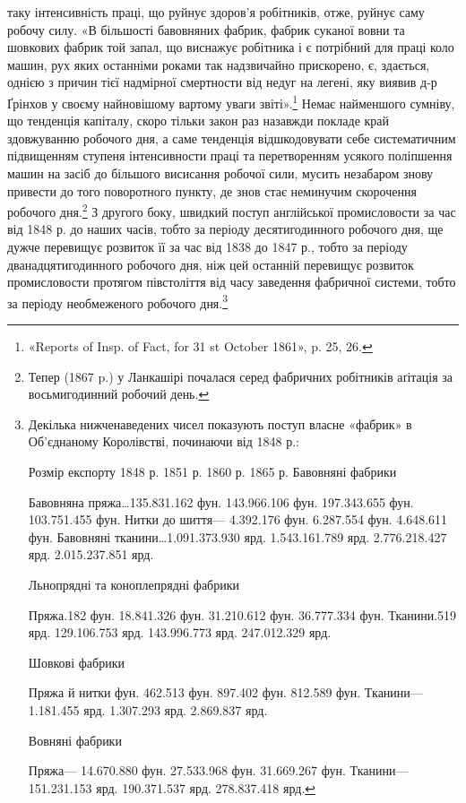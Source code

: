 \parcont{}  %
таку інтенсивність праці, що руйнує здоров’я робітників, отже,
руйнує саму робочу силу. «В більшості бавовняних фабрик, фабрик
суканої вовни та шовкових фабрик той запал, що виснажує
робітника і є потрібний для праці коло машин, рух яких останніми
роками так надзвичайно прискорено, є, здається, однією
з причин тієї надмірної смертности від недуг на легені, яку виявив
д-р Ґрінхов у своєму найновішому вартому уваги звіті».\footnote{
«Reports of Insp. of Fact, for 31 st October 1861», p. 25, 26.
}
Немає найменшого сумніву, що тенденція капіталу, скоро тільки
закон раз назавжди покладе край здовжуванню робочого дня,
а саме тенденція відшкодовувати себе систематичним підвищенням
ступеня інтенсивности праці та перетворенням усякого поліпшення
машин на засіб до більшого висисання робочої сили, мусить
незабаром знову привести до того поворотного пункту, де знов
стає неминучим скорочення робочого дня.\footnote{
Тепер (1867 p.) у Ланкашірі почалася серед фабричних робітників
аґітація за восьмигодинний робочий день.
} З другого боку,
швидкий поступ англійської промисловости за час від 1848 р. до
наших часів, тобто за періоду десятигодинного робочого дня, ще
дужче перевищує розвиток її за час від 1838 до 1847 р., тобто за
періоду дванадцятигодинного робочого дня, ніж цей останній
перевищує розвиток промисловости протягом півстоліття від часу
заведення фабричної системи, тобто за періоду необмеженого
робочого дня.\footnote{
Декілька нижченаведених чисел показують поступ власне «фабрик»
в Об’єднаному Королівстві, починаючи від 1848 р.:

                                                                                        Розмір
експорту
                                                             1848 р.               1851 р.
        1860 р.                 1865 р.
Бавовняні фабрики

Бавовняна пряжа\dots{}135.831.162 фун.   143.966.106 фун.  197.343.655 фун. 103.751.455 фун.
Нитки до шиття\dotfill                      —                 4.392.176 фун.    6.287.554 фун.
4.648.611 фун.
Бавовняні тканини\dots{}1.091.373.930 ярд.  1.543.161.789 ярд.    2.776.218.427 ярд.    2.015.237.851
ярд.

Льнопрядні та коноплепрядні фабрики

Пряжа.182 фун.    18.841.326 фун.    31.210.612 фун.    36.777.334 фун.
Тканини.519 ярд.    129.106.753 ярд.    143.996.773 ярд.    247.012.329 ярд.

Шовкові фабрики

Пряжа й нитки фун.    462.513 фун.      897.402 фун.         812.589 фун.
Тканини\dotfill              —             1.181.455 ярд.    1.307.293 ярд.
2.869.837 ярд.

Вовняні фабрики

Пряжа\dotfill               —       14.670.880 фун.    27.533.968 фун.
31.669.267 фун.
Тканини\dotfill              —     151.231.153 ярд.    190.371.537 ярд.
278.837.418 ярд.
}

